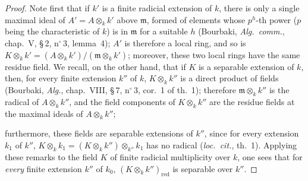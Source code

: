 \begin{proof}
Note first that if $k'$ is a finite radicial extension of $k$, there is only a single maximal ideal of $A'=A\otimes_k k'$ above $\mathfrak{m}$, formed of elements whose $p^h$-th power ($p$ being the characteristic of $k$) is in $\mathfrak{m}$ for a suitable $h$ (Bourbaki, \emph{Alg.\ comm.}, chap.~V, \S\,2, n$^\circ$\,3, lemma~4);
$A'$ is therefore a local ring, and so is
$K\otimes_k k'=(A\otimes_k k')/(\mathfrak{m}\otimes_k k')$; moreover, these two local rings have the same residue field.
We recall, on the other hand, that if $K$ is a separable extension of $k$, then, for every finite extension $k''$ of $k$, $K\otimes_k k''$ is a direct product of fields (Bourbaki, \emph{Alg.}, chap.~VIII, \S\,7, n$^\circ$\,3, cor.~1 of th.~1);
therefore $\mathfrak{m}\otimes_k k''$ is the radical of $A\otimes_k k''$, and the field components of $K\otimes_k k''$ are the residue fields at the maximal ideals of $A\otimes_k k''$;


furthermore, these fields are separable extensions of $k''$, since for every extension $k_1$ of $k''$,
$K\otimes_k k_1=(K\otimes_k k'')\otimes_{k''}k_1$ has no radical (\emph{loc.\ cit.}, th.~1).
Applying these remarks to the field $K$ of finite radicial multiplicity over $k$, one sees that for \emph{every} finite extension $k''$ of $k_0$, $(K\otimes_k k'')_{\mathrm{red}}$ is separable over $k''$.


\end{proof}
